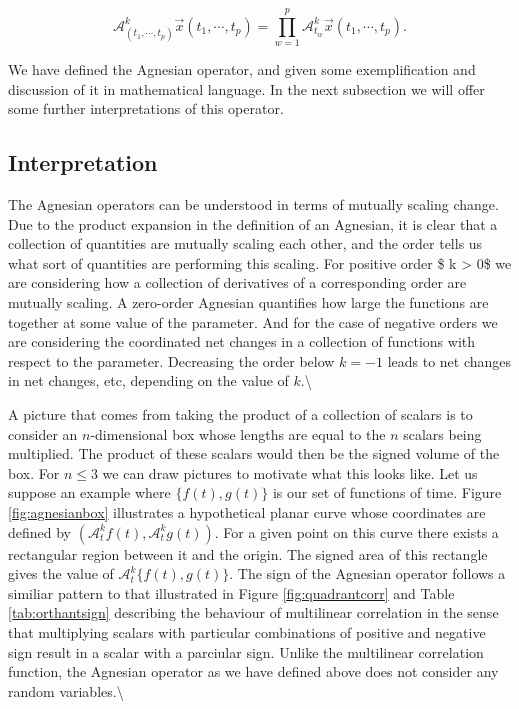 \documentclass[
  letterpaper,
  DIV=11,
  numbers=noendperiod]{scrreprt}
\begin{document}
\[\mathcal{A}_{(t_1, \cdots, t_p)}^{k} \vec{x}(t_1, \cdots, t_p) = \prod_{w=1}^p \mathcal{A}_{t_w}^k \vec{x}(t_1, \cdots, t_p).\]

We have defined the Agnesian operator, and given some exemplification
and discussion of it in mathematical language. In the next subsection we
will offer some further interpretations of this operator.

\subsection{Interpretation}\label{interpretation-3}

The Agnesian operators can be understood in terms of mutually scaling
change. Due to the product expansion in the definition of an Agnesian,
it is clear that a collection of quantities are mutually scaling each
other, and the order tells us what sort of quantities are performing
this scaling. For positive order \$ k \textgreater{} 0\$ we are
considering how a collection of derivatives of a corresponding order are
mutually scaling. A zero-order Agnesian quantifies how large the
functions are together at some value of the parameter. And for the case
of negative orders we are considering the coordinated net changes in a
collection of functions with respect to the parameter. Decreasing the
order below \(k=-1\) leads to net changes in net changes, etc, depending
on the value of \(k\).\textbackslash{}

A picture that comes from taking the product of a collection of scalars
is to consider an \(n\)-dimensional box whose lengths are equal to the
\(n\) scalars being multiplied. The product of these scalars would then
be the signed volume of the box. For \(n \leq 3\) we can draw pictures
to motivate what this looks like. Let us suppose an example where
\(\{ f(t), g(t) \}\) is our set of functions of time. Figure
\ref{fig:agnesianbox} illustrates a hypothetical planar curve whose
coordinates are defined by
\(\left( \mathcal{A}_t^k f(t), \mathcal{A}_t^k g(t) \right)\). For a
given point on this curve there exists a rectangular region between it
and the origin. The signed area of this rectangle gives the value of
\(\mathcal{A}_t^k\{ f(t), g(t) \}\). The sign of the Agnesian operator
follows a similiar pattern to that illustrated in Figure
\ref{fig:quadrantcorr} and Table \ref{tab:orthantsign} describing the
behaviour of multilinear correlation in the sense that multiplying
scalars with particular combinations of positive and negative sign
result in a scalar with a parciular sign. Unlike the multilinear
correlation function, the Agnesian operator as we have defined above
does not consider any random variables.\textbackslash{}
\end{document}
